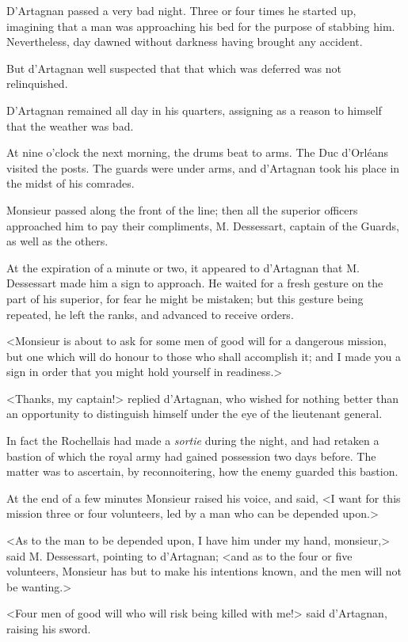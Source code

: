 D'Artagnan passed a very bad night. Three or four times he started up, imagining that a man was approaching his bed for the purpose of stabbing him. Nevertheless, day dawned without darkness having brought any accident. 

But d'Artagnan well suspected that that which was deferred was not relinquished. 

D'Artagnan remained all day in his quarters, assigning as a reason to himself that the weather was bad. 

At nine o'clock the next morning, the drums beat to arms. The Duc d'Orléans visited the posts. The guards were under arms, and d'Artagnan took his place in the midst of his comrades. 

Monsieur passed along the front of the line; then all the superior officers approached him to pay their compliments, M. Dessessart, captain of the Guards, as well as the others. 

At the expiration of a minute or two, it appeared to d'Artagnan that M. Dessessart made him a sign to approach. He waited for a fresh gesture on the part of his superior, for fear he might be mistaken; but this gesture being repeated, he left the ranks, and advanced to receive orders. 

<Monsieur is about to ask for some men of good will for a dangerous mission, but one which will do honour to those who shall accomplish it; and I made you a sign in order that you might hold yourself in readiness.> 

<Thanks, my captain!> replied d'Artagnan, who wished for nothing better than an opportunity to distinguish himself under the eye of the lieutenant general. 

In fact the Rochellais had made a \textit{sortie} during the night, and had retaken a bastion of which the royal army had gained possession two days before. The matter was to ascertain, by reconnoitering, how the enemy guarded this bastion. 

At the end of a few minutes Monsieur raised his voice, and said, <I want for this mission three or four volunteers, led by a man who can be depended upon.> 

<As to the man to be depended upon, I have him under my hand, monsieur,> said M. Dessessart, pointing to d'Artagnan; <and as to the four or five volunteers, Monsieur has but to make his intentions known, and the men will not be wanting.> 

<Four men of good will who will risk being killed with me!> said d'Artagnan, raising his sword. 

